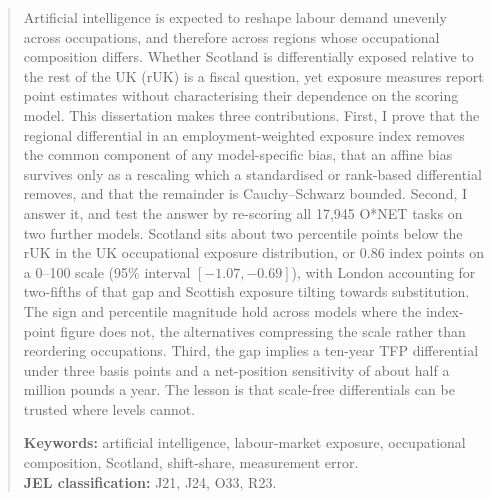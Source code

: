 \begin{abstract}
\noindent
Artificial intelligence is expected to reshape labour demand unevenly across occupations, and therefore across regions whose occupational composition differs. Whether Scotland is differentially exposed relative to the rest of the UK (rUK) is a fiscal question, yet exposure measures report point estimates without characterising their dependence on the scoring model. This dissertation makes three contributions. First, I prove that the regional differential in an employment-weighted exposure index removes the common component of any model-specific bias, that an affine bias survives only as a rescaling which a standardised or rank-based differential removes, and that the remainder is Cauchy--Schwarz bounded. Second, I answer it, and test the answer by re-scoring all 17,945 O*NET tasks on two further models. Scotland sits about two percentile points below the rUK in the UK occupational exposure distribution, or 0.86 index points on a 0--100 scale (95\% interval $[-1.07, -0.69]$), with London accounting for two-fifths of that gap and Scottish exposure tilting towards substitution. The sign and percentile magnitude hold across models where the index-point figure does not, the alternatives compressing the scale rather than reordering occupations. Third, the gap implies a ten-year TFP differential under three basis points and a net-position sensitivity of about half a million pounds a year. The lesson is that scale-free differentials can be trusted where levels cannot.

\medskip
\noindent\textbf{Keywords:} artificial intelligence, labour-market exposure, occupational composition, Scotland, shift-share, measurement error.\\
\textbf{JEL classification:} J21, J24, O33, R23.
\end{abstract}
\clearpage